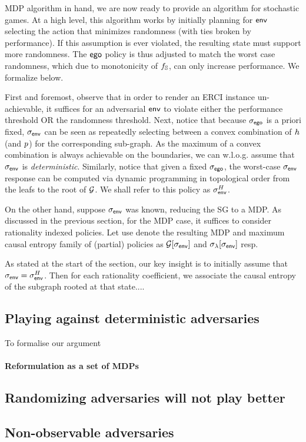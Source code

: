 MDP algorithm in hand, we are now ready to provide an algorithm for
stochastic games. At a high level, this algorithm works by initially
planning for $\mathsf{env}$ selecting the action that minimizes randomness
(with ties broken by performance). If this assumption is ever
violated, the resulting state must support more randomness.
The $\mathsf{ego}$ policy is thus adjusted to match the worst case
randomness, which due to monotonicity of $f_\mathbb{S}$, can only
increase performance. We formalize below.

 First and foremost, observe that in order to render an ERCI instance
un-achievable, it suffices for an adversarial $\mathsf{env}$ to violate
either the performance threshold OR the randomness threshold.  Next,
notice that because ${\sigma_{\mathsf{ego}}}$ is a priori fixed, ${\sigma_{\mathsf{env}}}$ can
be seen as repeatedly selecting between a convex combination of
$h$ (and $p$) for the corresponding sub-graph. As the maximum of a
convex combination is always achievable on the boundaries, we can
w.l.o.g. assume that ${\sigma_{\mathsf{env}}}$ is \emph{deterministic}.  Similarly,
notice that given a fixed ${\sigma_{\mathsf{ego}}}$, the worst-case ${\sigma_{\mathsf{env}}}$
response can be computed via dynamic programming in topological order
from the leafs to the root of $\mathcal{G}$. We shall refer to this policy
as ${\sigma_{\mathsf{env}}^H}$.

On the other hand, suppose ${\sigma_{\mathsf{env}}}$ was known, reducing the SG to
a MDP. As discussed in the previous section, for the MDP case, it
suffices to consider rationality indexed policies. Let use denote the
resulting MDP and  maximum causal entropy family of (partial) policies as
$\mathcal{G}[{\sigma_{\mathsf{env}}}]$ and $\sigma_\lambda[{\sigma_{\mathsf{env}}}]$ resp.

As stated at the start of the section, our key insight is to initially
assume that ${\sigma_{\mathsf{env}}} = {\sigma_{\mathsf{env}}^H}$. Then for each rationality
coefficient, we associate the causal entropy of the subgraph rooted
at that state....




\subsection{Playing against deterministic adversaries}
To formalise our argument
\paragraph{Reformulation as a set of MDPs}

\paragraph{}


\subsection{Randomizing adversaries will not play better}

\subsection{Non-observable adversaries}

